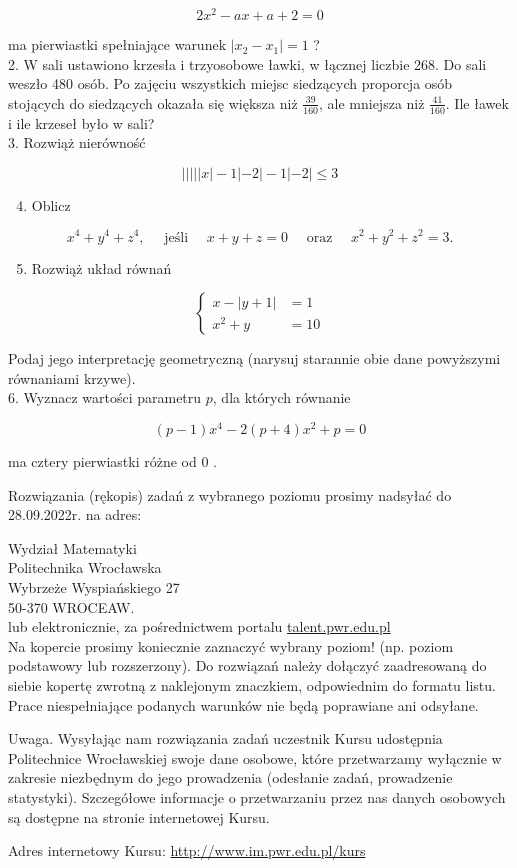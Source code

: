 \documentclass[10pt]{article}
\begin{document}
$$
2 x^{2}-a x+a+2=0
$$

ma pierwiastki spełniające warunek $\left|x_{2}-x_{1}\right|=1$ ?\\
2. W sali ustawiono krzesła i trzyosobowe ławki, w łącznej liczbie 268. Do sali weszło 480 osób. Po zajęciu wszystkich miejsc siedzących proporcja osób stojących do siedzących okazała się większa niż $\frac{39}{160}$, ale mniejsza niż $\frac{41}{160}$. Ile ławek i ile krzeseł było w sali?\\
3. Rozwiąż nierówność

$$
|||||x|-1|-2|-1|-2| \leqslant 3
$$

\begin{enumerate}
  \setcounter{enumi}{3}
  \item Oblicz
\end{enumerate}

$$
x^{4}+y^{4}+z^{4}, \quad \text { jeśli } \quad x+y+z=0 \quad \text { oraz } \quad x^{2}+y^{2}+z^{2}=3 .
$$

\begin{enumerate}
  \setcounter{enumi}{4}
  \item Rozwiąż układ równań
\end{enumerate}

$$
\left\{\begin{aligned}
x-|y+1| & =1 \\
x^{2}+y & =10
\end{aligned}\right.
$$

Podaj jego interpretację geometryczną (narysuj starannie obie dane powyższymi równaniami krzywe).\\
6. Wyznacz wartości parametru $p$, dla których równanie

$$
(p-1) x^{4}-2(p+4) x^{2}+p=0
$$

ma cztery pierwiastki różne od 0 .

Rozwiązania (rękopis) zadań z wybranego poziomu prosimy nadsyłać do 28.09.2022r. na adres:

Wydział Matematyki\\
Politechnika Wrocławska\\
Wybrzeże Wyspiańskiego 27\\
50-370 WROCEAW.\\
lub elektronicznie, za pośrednictwem portalu \href{http://talent.pwr.edu.pl}{talent.pwr.edu.pl}\\
Na kopercie prosimy koniecznie zaznaczyć wybrany poziom! (np. poziom podstawowy lub rozszerzony). Do rozwiązań należy dołączyć zaadresowaną do siebie kopertę zwrotną z naklejonym znaczkiem, odpowiednim do formatu listu. Prace niespełniające podanych warunków nie będą poprawiane ani odsyłane.

Uwaga. Wysyłając nam rozwiązania zadań uczestnik Kursu udostępnia Politechnice Wrocławskiej swoje dane osobowe, które przetwarzamy wyłącznie w zakresie niezbędnym do jego prowadzenia (odesłanie zadań, prowadzenie statystyki). Szczegółowe informacje o przetwarzaniu przez nas danych osobowych są dostępne na stronie internetowej Kursu.

Adres internetowy Kursu: \href{http://www.im.pwr.edu.pl/kurs}{http://www.im.pwr.edu.pl/kurs}
\end{document}
